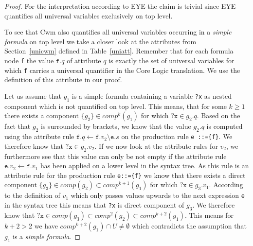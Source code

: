 \begin{proof}
 For the interpretation according to EYE the claim is trivial since EYE quantifies all universal variables exclusively on top level.
 
 To see that Cwm also quantifies all universal variables occurring in a \emph{simple formula} on top level we take a closer look at the 
 attributes from Section~\ref{unicwm} defined  in Table~\ref{uniatt}. Remember that for each formula node \texttt{f}
 the value $\texttt{f}.q$ of attribute $q$ is exactly the set of universal variables for which \texttt{f} carries a universal quantifier 
 in the \nthree Core Logic translation.  We use the definition of this attribute in our proof.
 
 Let us assume that $g_1$ is a simple formula containing a variable \texttt{?x} as nested component which is not quantified on top level. 
 This means, that for some $k\geq 1$ there exists a  
 component $\texttt{\{}g_2\texttt{\}}\in \textit{comp}^k(g_1)$ for which $\texttt{?x} \in g_2.q$. Based on the fact that $g_2$ is surrounded by brackets, 
 we know that the value  $g_2.q$ is computed using the attribute rule  
 $\texttt{f}.q \leftarrow \texttt{f}.v_2 \setminus \texttt{e}.s$ on the production rule \texttt{e ::=\{f\}}. We therefore know that $\texttt{?x}\in g_2.v_2$. 
 If we now look at the attribute rules for $v_2$, we furthermore see that this value can only be not empty if 
 the attribute rule $\texttt{e}.v_2\leftarrow\texttt{f}.v_1$ has been applied
 on a lower level in the syntax tree. As this rule is an attribute rule for the production rule
 \texttt{e::=\{f\}} we know that there exists a direct component $\texttt{\{}g_3\texttt{\}}\in \textit{comp}(g_2)\subset\textit{comp}^{k+1}(g_1)$ for which
 $\texttt{?x} \in g_3.v_1$. According to the definition of $v_1$ which only passes values upwards to the next expression \texttt{e} in the syntax tree this means
 that \texttt{?x} is direct  component of $g_3$. We therefore know that $\texttt{?x}\in \textit{comp}(g_3)\subset \textit{comp}^2(g_2)\subset \textit{comp}^{k+2}(g_1)$. This means for 
 $k+2>2$ we have $\textit{comp}^{k+2}(g_1)\cap U \neq \emptyset$ which contradicts the assumption that $g_1$ is a \emph{simple formula}.
 

\end{proof}
